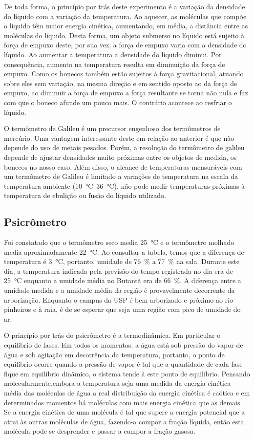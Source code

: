 De toda forma, o princípio por trás deste experimento é a variação da densidade do líquido com a variação da temperatura. Ao aquecer, as moléculas que compõe o líquido têm maior energia cinética, aumentando, em média, a distância entre as moléculas do líquido. Desta forma, um objeto submerso no líquido está sujeito à força de empuxo deste, por sua vez, a força de empuxo varia com a densidade do líquido. Ao aumentar a temperatura a densidade do líquido diminui. Por consequência, aumento na temperatura resulta em diminuição da força de empuxo. Como os bonecos também estão sujeitos à força gravitacional, atuando sobre eles sem variação, na mesma direção e em sentido oposto ao da força de empuxo, ao diminuir a força de empuxo a força resultante se torna não nula e faz com que o boneco afunde um pouco mais. O contrário acontece ao resfriar o líquido. 

O termômetro de Galileu é um precursor engenhoso dos termômetros de mercúrio. Uma vantagem interessante deste em relação ao anterior é que não depende do uso de metais pesados. Porém, a resolução do termômetro de galileu depende de ajustar densidades muito próximas entre os objetos de medida, os bonecos no nosso caso. Além disso, o alcance de temperaturas mensuráveis com um termômetro de Galileu é limitado a variações de temperatura na escala da temperatura ambiente (\qty{10}{\celsius}--\qty{36}{\celsius}), não pode medir temperaturas próximas à temperatura de ebulição ou fusão do líquido utilizado. 

\subsection{Psicrômetro}
Foi constatado que o termômetro seco media \qty{25}{\celsius} e o termômetro molhado media aproximadamente \qty{22}{\celsius}. Ao consultar a tabela, temos que a diferença de temperatura é \qty{3}{\celsius}, portanto, umidade de \qty{76}{\percent} a \qty{77}{\percent} na sala. Durante este dia, a temperatura indicada pela previsão do tempo registrada no dia era de \qty{25}{\celsius} enquanto a umidade média no Butantã era de \qty{66}{\percent}. A diferença entre a umidade medida e a umidade média da região é provavelmente decorrente da arborização. Enquanto o campus da USP é bem arborizado e próximo ao rio pinheiros e à raia, é de se esperar que seja uma região com pico de umidade do ar. 

O princípio por trás do psicrômetro é a termodinâmica. Em particular o equilíbrio de fases. Em todos os momentos, a água está sob pressão do vapor de água e sob agitação em decorrência da temperatura, portanto, o ponto de equilíbrio ocorre quando a pressão de vapor é tal que a quantidade de cada fase fique em equilíbrio dinâmico, o sistema tende à este ponto de equilíbrio. Pensando molecularmente,embora a temperatura seja uma medida da energia cinética média das moléculas de água a real distribuição da energia cinética é caótica e em determinados momentos há moléculas com mais energia cinética que as demais. Se a energia cinética de uma molécula é tal que supere a energia potencial que a atrai às outras moléculas de água, fazendo-a compor a fração líquida, então esta molécula pode se desprender e passar a compor a fração gasosa. 

